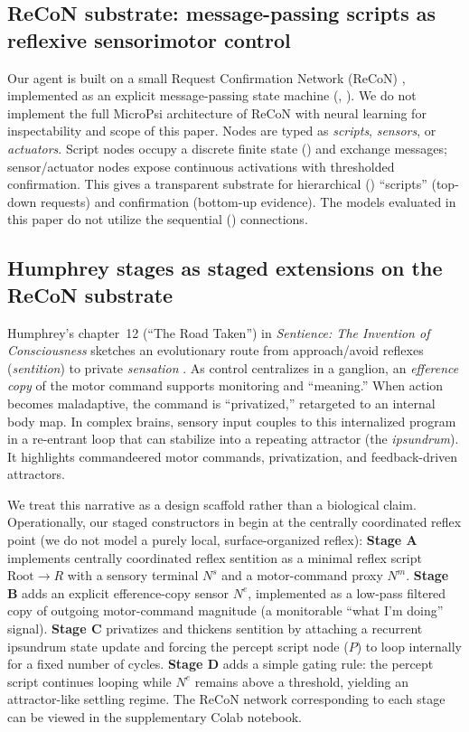 \documentclass[letterpaper]{article} %
\begin{document}
\subsection{ReCoN substrate: message-passing scripts as reflexive sensorimotor control}
Our agent is built on a small Request Confirmation Network (ReCoN) \citep{BachHerger2015ReCoN}, implemented as an explicit message-passing state machine (, ). We do not implement the full MicroPsi architecture of ReCoN with neural learning for inspectability and scope of this paper.
Nodes are typed as \emph{scripts}, \emph{sensors}, or \emph{actuators}. Script nodes occupy a discrete finite state () and exchange  messages; sensor/actuator nodes expose continuous activations with thresholded confirmation.
This gives a transparent substrate for hierarchical () ``scripts'' (top-down requests) and confirmation (bottom-up evidence). The models evaluated in this paper do not utilize the sequential () connections.

\subsection{Humphrey stages as staged extensions on the ReCoN substrate}
Humphrey’s chapter~12 (“The Road Taken”) in \emph{Sentience: The Invention of
  Consciousness} sketches an evolutionary route from approach/avoid reflexes (\emph{sentition})
  to private \emph{sensation} \citep{Humphrey2023Sentience}. As control
  centralizes in a ganglion, an \emph{efference copy} of the motor command
  supports monitoring and “meaning.” When action becomes maladaptive, the
  command is “privatized,” retargeted to an internal body map. In complex
  brains, sensory input couples to this internalized program in a re-entrant loop
  that can stabilize into a repeating attractor (the \emph{ipsundrum}). It
  highlights commandeered motor commands, privatization, and feedback-driven
  attractors.

We treat this narrative as a design scaffold rather than a biological claim.
Operationally, our staged constructors in  begin at the centrally coordinated reflex point (we do not model a purely local, surface-organized reflex):
\textbf{Stage A} implements centrally coordinated reflex sentition as a minimal reflex script $\text{Root}\rightarrow R$ with a sensory terminal $N^s$ and a motor-command proxy $N^m$.
\textbf{Stage B} adds an explicit efference-copy sensor $N^e$, implemented as a low-pass filtered copy of outgoing motor-command magnitude (a monitorable ``what I'm doing'' signal).
\textbf{Stage C} privatizes and thickens sentition by attaching a recurrent ipsundrum state update and forcing the percept script node ($P$) to loop internally for a fixed number of cycles.
\textbf{Stage D} adds a simple gating rule: the percept script continues looping while $N^e$ remains above a threshold, yielding an attractor-like settling regime. The ReCoN network corresponding
to each stage can be viewed in the supplementary Colab notebook.
\end{document}
